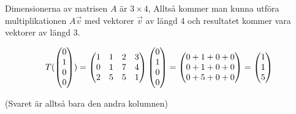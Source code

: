 \documentclass[../../main.tex]{subfiles}
\begin{document}
\begin{solution}{1}

Dimensionerna av matrisen $A$ är $3\times4$, Alltså kommer man kunna utföra multiplikationen $A\Vec{v}$ med vektorer $\Vec{v}$ av längd 4 och resultatet kommer vara vektorer av längd 3.


$$
T(\begin{pmatrix}0\\1\\0\\0\end{pmatrix}) = 
\begin{pmatrix}
1 & 1 & 2 & 3\\
0 & 1 & 7 & 4\\
2 & 5 & 5 & 1
\end{pmatrix} \begin{pmatrix}0\\1\\0\\0\end{pmatrix} =
\begin{pmatrix}0+1+0+0\\0+1+0+0\\0+5+0+0\end{pmatrix} = \begin{pmatrix}1\\1\\5\end{pmatrix}
$$ 

(Svaret är alltså bara den andra kolumnen)

\end{solution}
\end{document}
